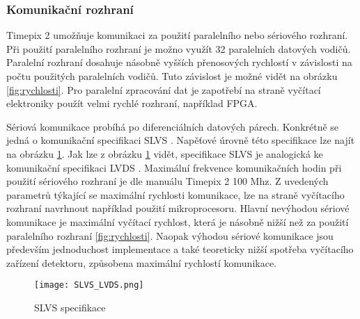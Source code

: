 \subsubsection{Komunikační rozhraní}
\label{Komunikacni rozhrani}
Timepix 2 umožňuje komunikaci za použití paralelního nebo sériového rozhraní. Při použití paralelního rozhraní je možno využít 32 paralelních datových vodičů. Paralelní rozhraní dosahuje násobně vyšších přenosových rychlostí v závislosti na počtu použitých paralelních vodičů. Tuto závislost je možné vidět na obrázku \ref{fig:rychlosti}. Pro paralelní zpracování dat je zapotřebí na straně vyčítací elektroniky použít velmi rychlé rozhraní, například FPGA.  
\par Sériová komunikace probíhá po diferenciálních datových párech. Konkrétně se jedná o komunikační specifikaci SLVS \cite{SLVS}. Napěťové úrovně této specifikace lze najít na obrázku \ref{fig:SLVS_LVDS}. Jak lze z obrázku \ref{fig:SLVS_LVDS} vidět, specifikace SLVS je analogická ke komunikační specifikaci LVDS \cite{LVDS}. Maximální frekvence komunikačních hodin při použití sériového rozhraní je dle manuálu Timepix 2 \cite{tpx2_manual} 100 Mhz. Z uvedených parametrů týkající se maximální rychlosti komunikace, lze na straně vyčítacího rozhraní navrhnout například použití mikroprocesoru. Hlavní nevýhodou sériové komunikace je maximální vyčítací rychlost, která je násobně nižší než za použití paralelního rozhraní \ref{fig:rychlosti}. Naopak výhodou sériové komunikace jsou především jednoduchost implementace a také teoreticky nižší spotřeba vyčítacího zařízení detektoru, způsobena maximální rychlostí komunikace.
\begin{figure}[h!]
	\centering
	\captionsetup{justification=centering}
	\texttt{[image: SLVS\_LVDS.png]}
	\caption{SLVS specifikace \cite{SLVS}} 
	\label{fig:SLVS_LVDS}
\end{figure}	

